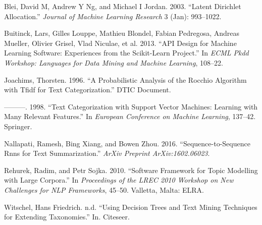 \hypertarget{ref-blei2003latent}{}
Blei, David M, Andrew Y Ng, and Michael I Jordan. 2003. ``Latent
Dirichlet Allocation.'' \emph{Journal of Machine Learning Research} 3
(Jan): 993--1022.

\hypertarget{ref-sklearn_api}{}
Buitinck, Lars, Gilles Louppe, Mathieu Blondel, Fabian Pedregosa,
Andreas Mueller, Olivier Grisel, Vlad Niculae, et al. 2013. ``API Design
for Machine Learning Software: Experiences from the Scikit-Learn
Project.'' In \emph{ECML Pkdd Workshop: Languages for Data Mining and
Machine Learning}, 108--22.

\hypertarget{ref-joachims1996probabilistic}{}
Joachims, Thorsten. 1996. ``A Probabilistic Analysis of the Rocchio
Algorithm with Tfidf for Text Categorization.'' DTIC Document.

\hypertarget{ref-joachims1998text}{}
---------. 1998. ``Text Categorization with Support Vector Machines:
Learning with Many Relevant Features.'' In \emph{European Conference on
Machine Learning}, 137--42. Springer.

\hypertarget{ref-nallapati2016sequence}{}
Nallapati, Ramesh, Bing Xiang, and Bowen Zhou. 2016.
``Sequence-to-Sequence Rnns for Text Summarization.'' \emph{ArXiv
Preprint ArXiv:1602.06023}.

\hypertarget{ref-rehurek_lrec}{}
Rehurek, Radim, and Petr Sojka. 2010. ``Software Framework for Topic
Modelling with Large Corpora.'' In \emph{Proceedings of the LREC 2010
Workshop on New Challenges for NLP Frameworks}, 45--50. Valletta, Malta:
ELRA.

\hypertarget{ref-witschel2005using}{}
Witschel, Hans Friedrich. n.d. ``Using Decision Trees and Text Mining
Techniques for Extending Taxonomies.'' In. Citeseer.
